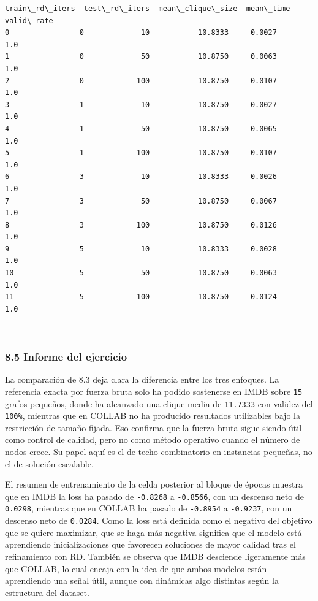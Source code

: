 \documentclass[11pt]{article}
\begin{document}
    
    \begin{Verbatim}[commandchars=\\\{\}]
    train\_rd\_iters  test\_rd\_iters  mean\_clique\_size  mean\_time  valid\_rate
0                0             10           10.8333     0.0027         1.0
1                0             50           10.8750     0.0063         1.0
2                0            100           10.8750     0.0107         1.0
3                1             10           10.8750     0.0027         1.0
4                1             50           10.8750     0.0065         1.0
5                1            100           10.8750     0.0107         1.0
6                3             10           10.8333     0.0026         1.0
7                3             50           10.8750     0.0067         1.0
8                3            100           10.8750     0.0126         1.0
9                5             10           10.8333     0.0028         1.0
10               5             50           10.8750     0.0063         1.0
11               5            100           10.8750     0.0124         1.0
    \end{Verbatim}

    
    \begin{center}
    \end{center}
    { \hspace*{\fill} \\}
    
    \subsubsection{8.5 Informe del ejercicio}\label{informe-del-ejercicio}

La comparación de 8.3 deja clara la diferencia entre los tres enfoques.
La referencia exacta por fuerza bruta solo ha podido sostenerse en IMDB
sobre \texttt{15} grafos pequeños, donde ha alcanzado una clique media
de \texttt{11.7333} con validez del \texttt{100\%}, mientras que en
COLLAB no ha producido resultados utilizables bajo la restricción de
tamaño fijada. Eso confirma que la fuerza bruta sigue siendo útil como
control de calidad, pero no como método operativo cuando el número de
nodos crece. Su papel aquí es el de techo combinatorio en instancias
pequeñas, no el de solución escalable.

El resumen de entrenamiento de la celda posterior al bloque de épocas
muestra que en IMDB la loss ha pasado de \texttt{-0.8268} a
\texttt{-0.8566}, con un descenso neto de \texttt{0.0298}, mientras que
en COLLAB ha pasado de \texttt{-0.8954} a \texttt{-0.9237}, con un
descenso neto de \texttt{0.0284}. Como la loss está definida como el
negativo del objetivo que se quiere maximizar, que se haga más negativa
significa que el modelo está aprendiendo inicializaciones que favorecen
soluciones de mayor calidad tras el refinamiento con RD. También se
observa que IMDB desciende ligeramente más que COLLAB, lo cual encaja
con la idea de que ambos modelos están aprendiendo una señal útil,
aunque con dinámicas algo distintas según la estructura del dataset.
\end{document}
